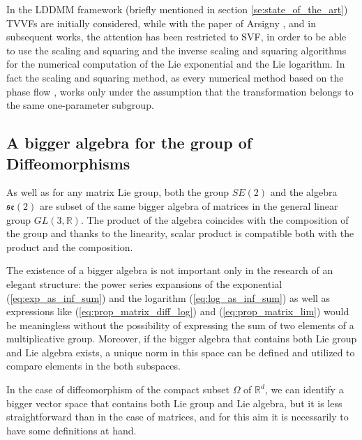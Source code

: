 In the LDDMM framework (briefly mentioned in section \ref{se:state_of_the_art}) TVVFs are initially considered, while with the paper of Arsigny \cite{arsigny2006log}, and in subsequent works, the attention has been restricted to SVF, in order to be able to use the scaling and squaring and the inverse scaling and squaring algorithms for the numerical computation of the Lie exponential and the Lie logarithm. In fact the scaling and squaring method, as every numerical method based on the phase flow \cite{ying2006phase}, works only under the assumption that the transformation belongs to the same one-parameter subgroup.


\subsection{A bigger algebra for the group of Diffeomorphisms}\label{subse:bigger_algebra}
As well as for any matrix Lie group, both the group $SE(2)$ and the algebra $\mathfrak{se}(2)$ are subset of the same bigger algebra of matrices in the general linear group $GL(3,\mathbb{R})$. The product of the algebra coincides with the composition of the group and thanks to the linearity, scalar product is compatible both with the product and the composition.

The existence of a bigger algebra is not important only in the research of an elegant structure: the power series expansions of the exponential (\ref{eq:exp_as_inf_sum}) and the logarithm (\ref{eq:log_as_inf_sum}) as well as expressions like (\ref{eq:prop_matrix_diff_log}) and (\ref{eq:prop_matrix_lim}) would be meaningless without the possibility of expressing the sum of two elements of a multiplicative group. Moreover, if the bigger algebra that contains both Lie group and Lie algebra exists, a unique norm in this space can be defined and utilized to compare elements in the both subspaces.

In the case of diffeomorphism of the compact subset $\Omega$ of $\mathbb{R}^d$, we can identify a bigger vector space that contains both Lie group and Lie algebra, but it is less straightforward than in the case of matrices, and for this aim it is necessarily to have some definitions at hand.

